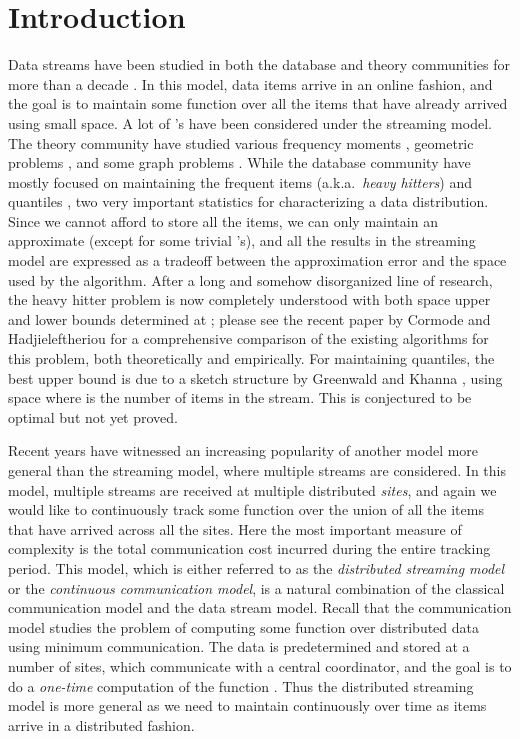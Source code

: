 \documentclass[10pt]{article}
\begin{document}
\section{Introduction}
Data streams have been studied in both the database and theory communities
for more than a decade \cite{alon99,babcock02:_model_}.  In this model,
data items arrive in an online fashion, and the goal is to maintain some
function  over all the items that have already arrived using small
space.  A lot of 's have been considered under the streaming model.  The
theory community have studied various frequency moments
\cite{alon99,indyk05:_optim_,woodruff04:_optim_}, geometric problems
\cite{Indyk:04,suri04:_range,agarwal07:_space_}, and some graph problems
\cite{feigenbaum05:_graph_,bar-yossef02:_reduc}.  While the database
community have mostly focused on maintaining the frequent items (a.k.a.\
{\em heavy hitters})
\cite{cormode08:_findin,cormode03,karp03,metwally06,manku02:_approx} and
quantiles \cite{gilbert02:_how,cormode06:_space,greenwald01:_space}, two
very important statistics for characterizing a data distribution.  Since we
cannot afford to store all the items, we can only maintain an approximate
 (except for some trivial 's), and all the results in the streaming
model are expressed as a tradeoff between the approximation error 
and the space used by the algorithm.  After a long and somehow disorganized
line of research, the heavy hitter problem is now completely understood
with both space upper and lower bounds determined at ;
please see the recent paper by Cormode and Hadjieleftheriou
\cite{cormode08:_findin} for a comprehensive comparison of the existing
algorithms for this problem, both theoretically and empirically.  For
maintaining quantiles, the best upper bound is due to a sketch structure by
Greenwald and Khanna \cite{greenwald01:_space}, using space  where  is the number of items in the stream.  This is
conjectured to be optimal but not yet proved.

Recent years have witnessed an increasing popularity of another model more
general than the streaming model, where multiple streams are considered.
In this model, multiple streams are received at multiple distributed {\em
  sites}, and again we would like to continuously track some function 
over the union of all the items that have arrived across all the sites.
Here the most important measure of complexity is the total communication
cost incurred during the entire tracking period.  This model, which is
either referred to as the {\em distributed streaming model} or the {\em
  continuous communication model}, is a natural combination of the
classical communication model \cite{yao79} and the data stream model.
Recall that the communication model studies the problem of computing some
function  over distributed data using minimum communication.  The
data is predetermined and stored at a number of sites, which communicate
with a central coordinator, and the goal is to do a {\em one-time}
computation of the function .  Thus the distributed streaming model is
more general as we need to maintain  continuously over time as items
arrive in a distributed fashion.
\end{document}
